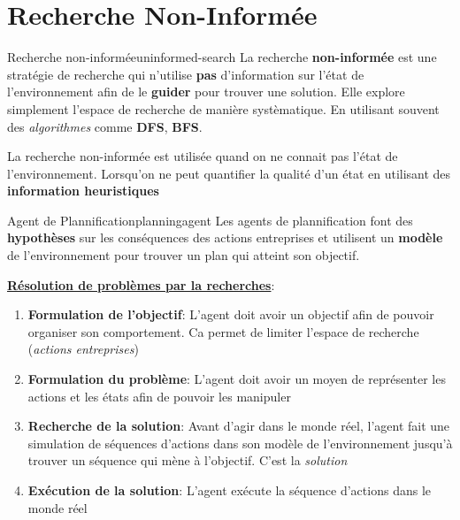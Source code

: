\documentclass[a4paper, 12pt]{extarticle}
\begin{document}
\section{Recherche Non-Informée} %
\label{sec:recherche}

\begin{definition}{Recherche non-informée}{uninformed-search}
    La recherche \textbf{non-informée} est une stratégie de recherche qui n'utilise \textbf{pas}
    d'information sur l'état de l'environnement afin de le \textbf{guider} pour trouver une solution.
    Elle explore simplement l'espace de recherche de manière systèmatique. En utilisant souvent 
    des \textit{algorithmes} comme \textbf{DFS}, \textbf{BFS}.
\end{definition}

\begin{remark}\leavevmode
    La recherche non-informée est utilisée quand on ne connait pas l'état de l'environnement. 
    Lorsqu'on ne peut quantifier la qualité d'un état en utilisant des \textbf{information heuristiques}
\end{remark}

\begin{definition}{Agent de Plannification}{planningagent}
    Les agents de plannification font des \textbf{hypothèses} sur les conséquences des actions entreprises
    et utilisent un \textbf{modèle} de l'environnement pour trouver un plan qui atteint son objectif.
\end{definition}

\underline{\textbf{Résolution de problèmes par la recherches}}:
\begin{enumerate}
    \item \textbf{Formulation de l'objectif}: L'agent doit avoir un objectif afin 
        de pouvoir organiser son comportement. Ca permet de limiter l'espace de recherche (\textit{actions entreprises})
    \item \textbf{Formulation du problème}: L'agent doit avoir un moyen de représenter les actions et les états 
        afin de pouvoir les manipuler
    \item \textbf{Recherche de la solution}: Avant d'agir dans le monde réel, l'agent  fait  une 
        simulation de séquences d'actions dans son modèle de l'environnement jusqu'à trouver un séquence 
        qui mène à l'objectif. C'est  la \textit{solution}
    \item \textbf{Exécution de la solution}: L'agent exécute la séquence d'actions dans le monde réel
\end{enumerate}
\end{document}
